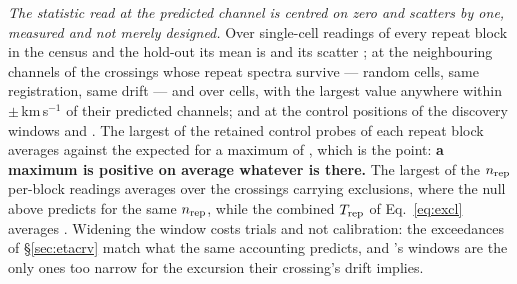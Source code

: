 \emph{The statistic read at the predicted channel is centred on zero and
scatters by one, measured and not merely designed.} Over \NuNullN{}
single-cell readings of every repeat block in the census and the hold-out its
mean is \NuNullMean{} and its scatter \NuNullSd; at the neighbouring channels
of the \WdBandNCross{} crossings whose repeat spectra survive --- random
cells, same registration, same drift --- \NuBandMean{} and \NuBandSd{} over
\NuBandN{} cells, with \WdBandMax{} the largest value anywhere within
$\pm$\WdBandKms\,km\,s$^{-1}$ of their predicted channels; and at the control
positions of the discovery windows \NuDiscCtrlMean{} and \NuDiscCtrlSd. The
largest of the \NuCtrlRet{} retained control probes of each repeat block
averages \NuCtrlMean{} against the \NuCtrlPred{} expected for a maximum of
\NuCtrlRet, which is the point: \textbf{a maximum is positive on average
whatever is there.} The largest of the $n_{\rm rep}$ per-block readings
averages \NuColMean{} over the crossings carrying exclusions, where the null
above predicts \NuColPred{} for the same $n_{\rm rep}$, while the combined
$T_{\rm rep}$ of Eq.~\ref{eq:excl} averages \NuRepMean. Widening the window
costs trials and not calibration: the exceedances of \S\ref{sec:etacrv} match
what the same accounting predicts, and \WdOrbShortStar's windows are the only
ones too narrow for the excursion their crossing's drift implies.

